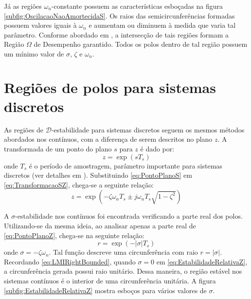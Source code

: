 Já as regiões $\omega_n$-constante possuem as características esboçadas na figura \ref{subfig:OscilacaoNaoAmortecidaS}. Os raios das semicircunferências formadas possuem valores iguais à $\omega_n$ e aumentam ou diminuem à medida que varia tal parâmetro. Conforme abordado em \cite{CHILALI1996}, a intersecção de tais regiões formam a Região $\Omega$ de Desempenho garantido. Todos os polos dentro de tal região possuem um mínimo valor de $\sigma$, $\zeta$ e $\omega_n$.

\section{Regiões de polos para sistemas discretos}\label{sec:SistemasDiscretos}

As regiões de $\mathscr{D}$-estabilidade para sistemas discretos seguem os mesmos métodos abordados nos contínuos, com a diferença de serem descritos no plano $z$. A transformada de um ponto do plano $s$ para $z$ é dado por:
\begin{equation}
  z = \exp(sT_s)\label{eq:TransformacaoSZ}
\end{equation}
onde $T_s$ é o período de amostragem, parâmetro importante para sistemas discretos (ver detalhes em \cite{KUO1980}). Substituindo \eqref{eq:PontoPlanoS} em \eqref{eq:TransformacaoSZ}, chega-se a seguinte relação:
\begin{equation}
  z = \exp{\left(-\zeta\omega_nT_s \pm j\omega_nT_s\sqrt{1-\zeta^2}\right)}\label{eq:PontoPlanoZ}
\end{equation}

A $\sigma$-estabilidade nos contínuos foi encontrada verificando a parte real dos polos. Utilizando-se da mesma ideia, ao analisar apenas a parte real de \eqref{eq:PontoPlanoZ}, chega-se na seguinte relação:
\begin{equation}
  r = \exp{\left(-|\sigma|T_s\right)}\label{eq:EstabilidadeRelativaZ}
\end{equation}
onde $\sigma = -\zeta\omega_n$. Tal função descreve uma circunferência com raio $r = |\sigma|$. Recordando \eqref{eq:LMIRightBounded}, quando $\sigma = 0$ em \eqref{eq:EstabilidadeRelativaZ}, a circunferência gerada possui raio unitário. Dessa maneira, o região estável nos sistemas contínuos é o interior de uma circunferência unitária. A figura \ref{subfig:EstabilidadeRelativaZ} mostra esboços para vários valores de $\sigma$.

